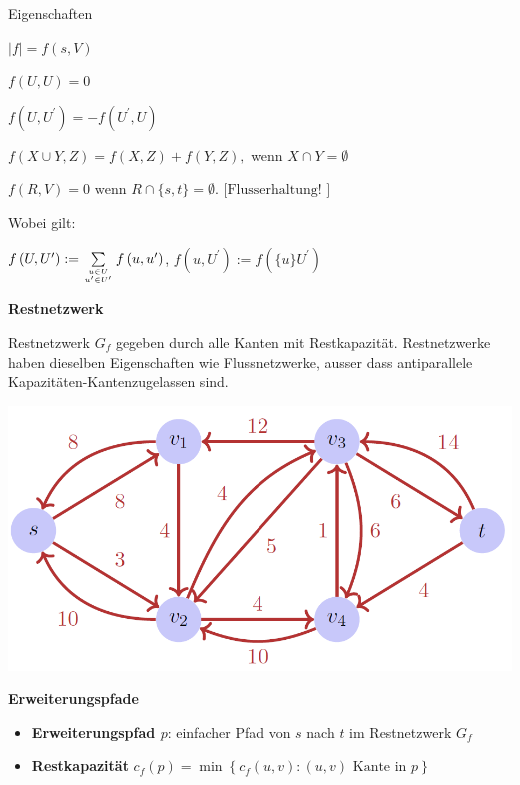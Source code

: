 \begin{sectionbox}
\begin{cookbox}{Eigenschaften}
\item $|f|=f(s, V)$
\item $f(U, U)=0$
\item $f\left(U, U^{\prime}\right)=-f\left(U^{\prime}, U\right)$
\item $f(X \cup Y, Z)=f(X, Z)+f(Y, Z),$ wenn $X \cap Y=\emptyset$
\item $f(R, V)=0 \text { wenn } R \cap\{s, t\}=\emptyset . \text { [Flusserhaltung! }]$\smallskip
\par Wobei gilt:
\par $f\left(U, U^{\prime}\right):=\sum\limits_{u \in U \atop u^{\prime} \in U^{\prime}} f\left(u, u^{\prime}\right)$, $f\left(u, U^{\prime}\right):=f\left(\{u\}U^{\prime}\right)$
\end{cookbox}\medskip

\textbf{Restnetzwerk}\par
Restnetzwerk $G_{f}$ gegeben durch alle Kanten mit Restkapazität. Restnetzwerke haben dieselben Eigenschaften wie Flussnetzwerke, ausser dass antiparallele Kapazitäten-Kantenzugelassen sind.\par\smallskip
\begin{center}
    \includegraphics[width = 0.9\columnwidth]{../img/restNet.png}
\end{center}\par\smallskip

\textbf{Erweiterungspfade}\par
\begin{itemize}
    \item \textbf{Erweiterungspfad $p$}: einfacher Pfad von $s$ nach $t$ im Restnetzwerk $G_{f}$
    \item \textbf{Restkapazität} $c_{f}(p)=\min \left\{c_{f}(u, v):(u, v) \text { Kante in } p\right\}$
\end{itemize}

\end{sectionbox}

